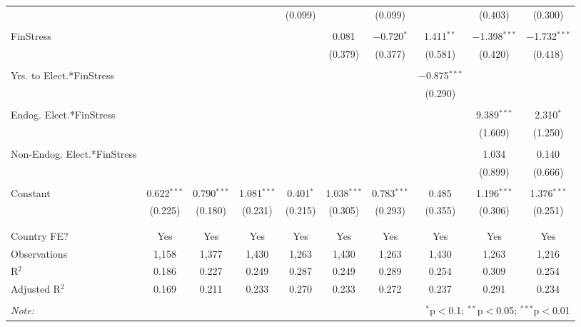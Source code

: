 \begin{table}[!htbp]
\begin{tabular}{@{\extracolsep{5pt}}lccccccccc}
  &  &  &  & (0.099) &  & (0.099) &  & (0.403) & (0.300) \\ 
  & & & & & & & & & \\ 
 FinStress &  &  &  &  & 0.081 & $-$0.720$^{*}$ & 1.411$^{**}$ & $-$1.398$^{***}$ & $-$1.732$^{***}$ \\ 
  &  &  &  &  & (0.379) & (0.377) & (0.581) & (0.420) & (0.418) \\ 
  & & & & & & & & & \\ 
 Yrs. to Elect.*FinStress &  &  &  &  &  &  & $-$0.875$^{***}$ &  &  \\ 
  &  &  &  &  &  &  & (0.290) &  &  \\ 
  & & & & & & & & & \\ 
 Endog. Elect.*FinStress &  &  &  &  &  &  &  & 9.389$^{***}$ & 2.310$^{*}$ \\ 
  &  &  &  &  &  &  &  & (1.609) & (1.250) \\ 
  & & & & & & & & & \\ 
 Non-Endog. Elect.*FinStress &  &  &  &  &  &  &  & 1.034 & 0.140 \\ 
  &  &  &  &  &  &  &  & (0.899) & (0.666) \\ 
  & & & & & & & & & \\ 
 Constant & 0.622$^{***}$ & 0.790$^{***}$ & 1.081$^{***}$ & 0.401$^{*}$ & 1.038$^{***}$ & 0.783$^{***}$ & 0.485 & 1.196$^{***}$ & 1.376$^{***}$ \\ 
  & (0.225) & (0.180) & (0.231) & (0.215) & (0.305) & (0.293) & (0.355) & (0.306) & (0.251) \\ 
  & & & & & & & & & \\ 
\hline \\[-1.8ex] 
Country FE? & Yes & Yes & Yes & Yes & Yes & Yes & Yes & Yes & Yes \\ 
Observations & 1,158 & 1,377 & 1,430 & 1,263 & 1,430 & 1,263 & 1,430 & 1,263 & 1,216 \\ 
R$^{2}$ & 0.186 & 0.227 & 0.249 & 0.287 & 0.249 & 0.289 & 0.254 & 0.309 & 0.254 \\ 
Adjusted R$^{2}$ & 0.169 & 0.211 & 0.233 & 0.270 & 0.233 & 0.272 & 0.237 & 0.291 & 0.234 \\ 
\hline 
\hline \\[-1.8ex] 
\textit{Note:}  & \multicolumn{9}{r}{$^{*}$p$<$0.1; $^{**}$p$<$0.05; $^{***}$p$<$0.01} \\ 
\end{tabular} 
\end{table} 
